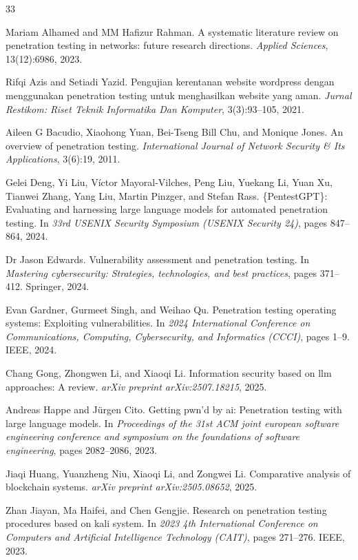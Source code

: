 \documentclass[conference]{IEEEtran}
\begin{document}
\begin{thebibliography}{33}

Mariam Alhamed and MM Hafizur Rahman. 
A systematic literature review on penetration testing in networks: future research directions. 
\emph{Applied Sciences}, 13(12):6986, 2023.

Rifqi Azis and Setiadi Yazid. 
Pengujian kerentanan website wordpress dengan menggunakan penetration testing untuk menghasilkan website yang aman. 
\emph{Jurnal Restikom: Riset Teknik Informatika Dan Komputer}, 3(3):93--105, 2021.

Aileen G Bacudio, Xiaohong Yuan, Bei-Tseng Bill Chu, and Monique Jones. 
An overview of penetration testing. 
\emph{International Journal of Network Security \& Its Applications}, 3(6):19, 2011.

Gelei Deng, Yi Liu, V\'{i}ctor Mayoral-Vilches, Peng Liu, Yuekang Li, Yuan Xu, Tianwei Zhang, Yang Liu, Martin Pinzger, and Stefan Rass. 
\{PentestGPT\}: Evaluating and harnessing large language models for automated penetration testing. 
In \emph{33rd USENIX Security Symposium (USENIX Security 24)}, pages 847--864, 2024.

Dr Jason Edwards. 
Vulnerability assessment and penetration testing. 
In \emph{Mastering cybersecurity: Strategies, technologies, and best practices}, pages 371--412. Springer, 2024.

Evan Gardner, Gurmeet Singh, and Weihao Qu. 
Penetration testing operating systems: Exploiting vulnerabilities. 
In \emph{2024 International Conference on Communications, Computing, Cybersecurity, and Informatics (CCCI)}, pages 1--9. IEEE, 2024.

Chang Gong, Zhongwen Li, and Xiaoqi Li. 
Information security based on llm approaches: A review. 
\emph{arXiv preprint arXiv:2507.18215}, 2025.

Andreas Happe and J\"{u}rgen Cito. 
Getting pwn’d by ai: Penetration testing with large language models. 
In \emph{Proceedings of the 31st ACM joint european software engineering conference and symposium on the foundations of software engineering}, pages 2082--2086, 2023.

Jiaqi Huang, Yuanzheng Niu, Xiaoqi Li, and Zongwei Li. 
Comparative analysis of blockchain systems. 
\emph{arXiv preprint arXiv:2505.08652}, 2025.

Zhan Jiayan, Ma Haifei, and Chen Gengjie. 
Research on penetration testing procedures based on kali system. 
In \emph{2023 4th International Conference on Computers and Artificial Intelligence Technology (CAIT)}, pages 271--276. IEEE, 2023.


\end{thebibliography}
\end{document}
